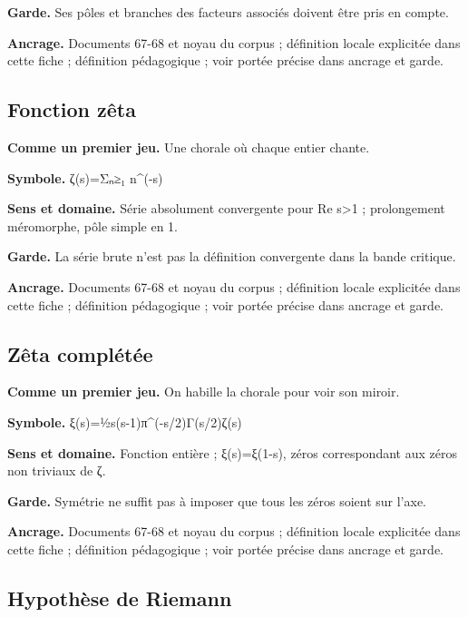 \documentclass[
  9pt,
  a4paper,
]{article}
\begin{document}
\textbf{Garde.} Ses pôles et branches des facteurs associés doivent être
pris en compte.

\textbf{Ancrage.} Documents 67-68 et noyau du corpus ; définition locale
explicitée dans cette fiche ; définition pédagogique ; voir portée
précise dans ancrage et garde.

\hypertarget{fonction-zuxeata}{%
\subsection{Fonction zêta}\label{fonction-zuxeata}}

\textbf{Comme un premier jeu.} Une chorale où chaque entier chante.

\textbf{Symbole.} ζ(s)=Σₙ≥₁ n\^{}(-s)

\textbf{Sens et domaine.} Série absolument convergente pour Re
s\textgreater1 ; prolongement méromorphe, pôle simple en 1.

\textbf{Garde.} La série brute n'est pas la définition convergente dans
la bande critique.

\textbf{Ancrage.} Documents 67-68 et noyau du corpus ; définition locale
explicitée dans cette fiche ; définition pédagogique ; voir portée
précise dans ancrage et garde.

\hypertarget{zuxeata-compluxe9tuxe9e}{%
\subsection{Zêta complétée}\label{zuxeata-compluxe9tuxe9e}}

\textbf{Comme un premier jeu.} On habille la chorale pour voir son
miroir.

\textbf{Symbole.} ξ(s)=½s(s-1)π\^{}(-s/2)Γ(s/2)ζ(s)

\textbf{Sens et domaine.} Fonction entière ; ξ(s)=ξ(1-s), zéros
correspondant aux zéros non triviaux de ζ.

\textbf{Garde.} Symétrie ne suffit pas à imposer que tous les zéros
soient sur l'axe.

\textbf{Ancrage.} Documents 67-68 et noyau du corpus ; définition locale
explicitée dans cette fiche ; définition pédagogique ; voir portée
précise dans ancrage et garde.

\hypertarget{hypothuxe8se-de-riemann}{%
\subsection{Hypothèse de Riemann}\label{hypothuxe8se-de-riemann}}
\end{document}
